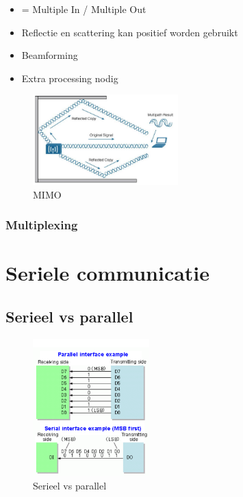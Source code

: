 \documentclass{article}
\begin{document}
\begin{itemize}
    \item = Multiple In / Multiple Out
    \item Reflectie en scattering kan positief worden gebruikt 
    \item Beamforming
    \item Extra processing nodig
\end{itemize}

\begin{figure}[H]
    \centering
    \includegraphics[width=0.5\textwidth]{Screenshot_20200309_125719.png}
    \caption{MIMO}
\end{figure}

\subsubsection{Multiplexing}

\section{Seriele communicatie}
\subsection{Serieel vs parallel}

\begin{figure}[H]
    \centering
    \includegraphics[width=0.4\textwidth]{Screenshot_20200323_114507.png}
    \caption{Serieel vs parallel}
\end{figure}
\end{document}
